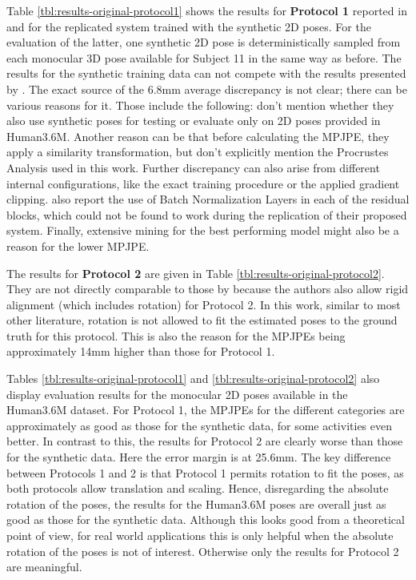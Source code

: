 



Table \ref{tbl:results-original-protocol1} shows the results for \textbf{Protocol 1} reported in \cite{drover18} and for the replicated system trained with the synthetic 2D poses.
For the evaluation of the latter, one synthetic 2D pose is deterministically sampled from each monocular 3D pose available for Subject 11 in the same way as before.
The results for the synthetic training data can not compete with the results presented by \citet{drover18}.
The exact source of the 6.8mm average discrepancy is not clear; there can be various reasons for it.
Those include the following:
\citet{drover18} don't mention whether they also use synthetic poses for testing or evaluate only on 2D poses provided in Human3.6M.
Another reason can be that before calculating the MPJPE, they apply a similarity transformation, but don't explicitly mention the Procrustes Analysis used in this work.
Further discrepancy can also arise from different internal configurations, like the exact training procedure or the applied gradient clipping.
\citet{drover18} also report the use of Batch Normalization Layers in each of the residual blocks, which could not be found to work during the replication of their proposed system.
Finally, extensive mining for the best performing model might also be a reason for the lower MPJPE.

The results for \textbf{Protocol 2} are given in Table \ref{tbl:results-original-protocol2}.
They are not directly comparable to those by \citet{drover18} because the authors also allow rigid alignment (which includes rotation) for Protocol 2.
In this work, similar to most other literature, rotation is not allowed to fit the estimated poses to the ground truth for this protocol.
This is also the reason for the MPJPEs being approximately 14mm higher than those for Protocol 1.

Tables \ref{tbl:results-original-protocol1} and \ref{tbl:results-original-protocol2} also display evaluation results for the monocular 2D poses available in the Human3.6M dataset.
For Protocol 1, the MPJPEs for the different categories are approximately as good as those for the synthetic data, for some activities even better.
In contrast to this, the results for Protocol 2 are clearly worse than those for the synthetic data.
Here the error margin is at 25.6mm.
The key difference between Protocols 1 and 2 is that Protocol 1 permits rotation to fit the poses, as both protocols allow translation and scaling.
Hence, disregarding the absolute rotation of the poses, the results for the Human3.6M poses are overall just as good as those for the synthetic data.
Although this looks good from a theoretical point of view, for real world applications this is only helpful when the absolute rotation of the poses is not of interest.
Otherwise only the results for Protocol 2 are meaningful.

